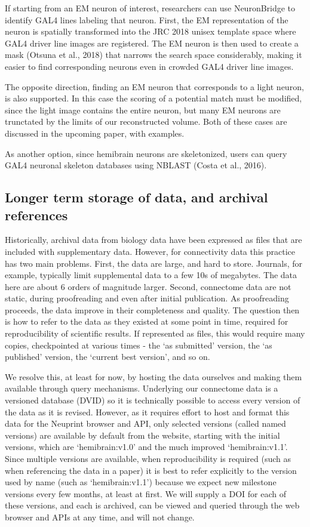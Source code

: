 \documentclass{article}
\begin{document}
If starting from an EM neuron of interest, researchers can use NeuronBridge to identify GAL4 lines labeling that neuron. First, the EM representation of the neuron is spatially transformed into the JRC 2018 unisex template space where GAL4 driver line images are registered. The EM neuron is then used to create a mask (Otsuna et al., 2018) that narrows the search space considerably, making it easier to find corresponding neurons even in crowded GAL4 driver line images.

The opposite direction, finding an EM neuron that corresponds to a light neuron, is also supported. In this case the scoring of a potential match must be modified, since the light image contains the entire neuron, but many EM neurons are trunctated by the limits of our reconstructed volume. Both of these cases are discussed in the upcoming paper, with examples.

As another option, since hemibrain neurons are skeletonized, users can query GAL4 neuronal skeleton databases using NBLAST (Costa et al., 2016).

\subsection*{Longer term storage of data, and archival references}

Historically, archival data from biology data have been expressed as files that are included with supplementary data. However, for connectivity data this practice has two main problems. First, the data are large, and hard to store. Journals, for example, typically limit supplemental data to a few 10s of megabytes. The data here are about 6 orders of magnitude larger. Second, connectome data are not static, during proofreading and even after initial publication. As proofreading proceeds, the data improve in their completeness and quality. The question then is how to refer to the data as they existed at some point in time, required for reproducibility of scientific results. If represented as files, this would require many copies, checkpointed at various times - the ‘as submitted’ version, the ‘as published’ version, the ‘current best version’, and so on.

We resolve this, at least for now, by hosting the data ourselves and making them available through query mechanisms. Underlying our connectome data is a versioned database (DVID) so it is technically possible to access every version of the data as it is revised. However, as it requires effort to host and format this data for the Neuprint browser and API, only selected versions (called named versions) are available by default from the website, starting with the initial versions, which are ‘hemibrain:v1.0’ and the much improved ‘hemibrain:v1.1’. Since multiple versions are available, when reproducibility is required (such as when referencing the data in a paper) it is best to refer explicitly to the version used by name (such as ‘hemibrain:v1.1’) because we expect new milestone versions every few months, at least at first. We will supply a DOI for each of these versions, and each is archived, can be viewed and queried through the web browser and APIs at any time, and will not change.
\end{document}
